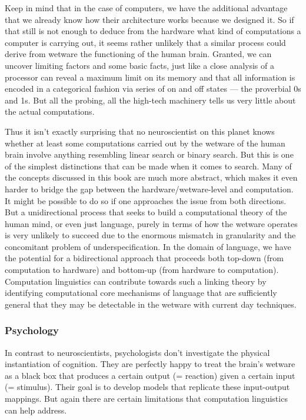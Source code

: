 Keep in mind that in the case of computers, we have the additional advantage that we already know how their architecture works because we designed it.
So if that still is not enough to deduce from the hardware what kind of computations a computer is carrying out, it seems rather unlikely that a similar process could derive from wetware the functioning of the human brain.
Granted, we can uncover limiting factors and some basic facts, just like a close analysis of a processor can reveal a maximum limit on its memory and that all information is encoded in a categorical fashion via series of on and off states --- the proverbial 0s and 1s.
But all the probing, all the high-tech machinery tells us very little about the actual computations.

Thus it isn't exactly surprising that no neuroscientist on this planet knows whether at least some computations carried out by the wetware of the human brain involve anything resembling linear search or binary search.
But this is one of the simplest distinctions that can be made when it comes to search.
Many of the concepts discussed in this book are much more abstract, which makes it even harder to bridge the gap between the hardware\slash wetware-level and computation.
It might be possible to do so if one approaches the issue from both directions.
But a unidirectional process that seeks to build a computational theory of the human mind, or even just language, purely in terms of how the wetware operates is very unlikely to succeed due to the enormous mismatch in granularity and the concomitant problem of underspecification.
In the domain of language, we have the potential for a bidirectional approach that proceeds both top-down (from computation to hardware) and bottom-up (from hardware to computation).
Computation linguistics can contribute towards such a linking theory by identifying computational core mechanisms of language that are sufficiently general that they may be detectable in the wetware with current day techniques.


\subsubsection{Psychology}
\label{sub:formal_arguments_science_psych}

In contrast to neuroscientists, psychologists don't investigate the physical instantiation of cognition.
They are perfectly happy to treat the brain's wetware as a black box that produces a certain output (= reaction) given a certain input (= stimulus).
Their goal is to develop models that replicate these input-output mappings.
But again there are certain limitations that computation linguistics can help address.

